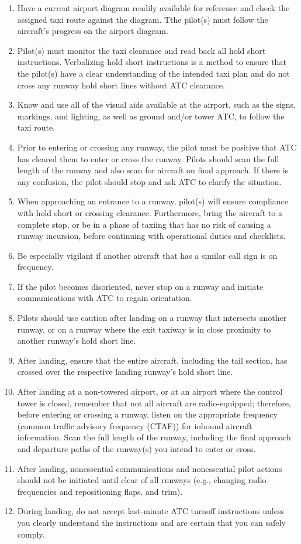 \documentclass[12pt]{article}
\begin{document}
					\begin{enumerate}
						\item Have a current airport diagram readily available for reference and check the assigned taxi route against the diagram. Tthe pilot(s) must follow the aircraft’s progress on the airport diagram.
						\item Pilot(s) must monitor the taxi clearance and read back all hold short instructions. Verbalizing hold short instructions is a method to ensure that the pilot(s) have a clear understanding of the intended taxi plan and do not cross any runway hold short lines without ATC clearance. 
						\item Know and use all of the visual aids available at the airport, such as the signs, markings, and lighting, as well as ground and/or tower ATC, to follow the taxi route.
						\item Prior to entering or crossing any runway, the pilot must be positive that ATC has cleared them to enter or cross the runway. Pilots should scan the full length of the runway and also scan for aircraft on final approach. If there is any confusion, the pilot should stop and ask ATC to clarify the situation. 
						\item  When approaching an entrance to a runway, pilot(s) will ensure compliance with hold short or crossing clearance. Furthermore, bring the aircraft to a complete stop, or be in a phase of taxiing that has no risk of causing a runway incursion, before continuing with operational duties and checklists. 
						\item Be especially vigilant if another aircraft that has a similar call sign is on frequency. 
						\item If the pilot becomes disoriented, never stop on a runway and initiate communications with ATC to regain orientation.
						\item Pilots should use caution after landing on a runway that intersects another runway, or on a runway where the exit taxiway is in close proximity to another runway’s hold short line.
						\item After landing, ensure that the entire aircraft, including the tail section, has crossed over the respective landing runway’s hold short line.
						\item After landing at a non-towered airport, or at an airport where the control tower is closed, remember that not all aircraft are radio-equipped; therefore, before entering or crossing a runway, listen on the appropriate frequency (common traffic advisory frequency (CTAF)) for inbound aircraft information. Scan the full length of the runway, including the final approach and departure paths of the runway(s) you intend to enter or cross. 
						\item  After landing, nonessential communications and nonessential pilot actions should not be initiated until clear of all runways (e.g., changing radio frequencies and repositioning flaps, and trim).
						\item During landing, do not accept last-minute ATC turnoff instructions unless you clearly understand the instructions and are certain that you can safely comply. 
					\end{enumerate}
\end{document}
